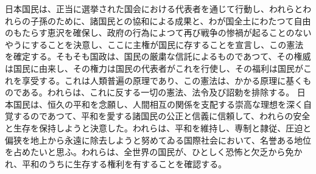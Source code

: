 
日本国民は、正当に選挙された国会における代表者を通じて行動し、われらとわれらの子孫のために、諸国民との協和による成果と、わが国全土にわたつて自由のもたらす恵沢を確保し、政府の行為によつて再び戦争の惨禍が起ることのないやうにすることを決意し、ここに主権が国民に存することを宣言し、この憲法を確定する。そもそも国政は、国民の厳粛な信託によるものであつて、その権威は国民に由来し、その権力は国民の代表者がこれを行使し、その福利は国民がこれを享受する。これは人類普遍の原理であり、この憲法は、かかる原理に基くものである。われらは、これに反する一切の憲法、法令及び詔勅を排除する。
日本国民は、恒久の平和を念願し、人間相互の関係を支配する崇高な理想を深く自覚するのであつて、平和を愛する諸国民の公正と信義に信頼して、われらの安全と生存を保持しようと決意した。われらは、平和を維持し、専制と隷従、圧迫と偏狭を地上から永遠に除去しようと努めてゐる国際社会において、名誉ある地位を占めたいと思ふ。われらは、全世界の国民が、ひとしく恐怖と欠乏から免かれ、平和のうちに生存する権利を有することを確認する。
